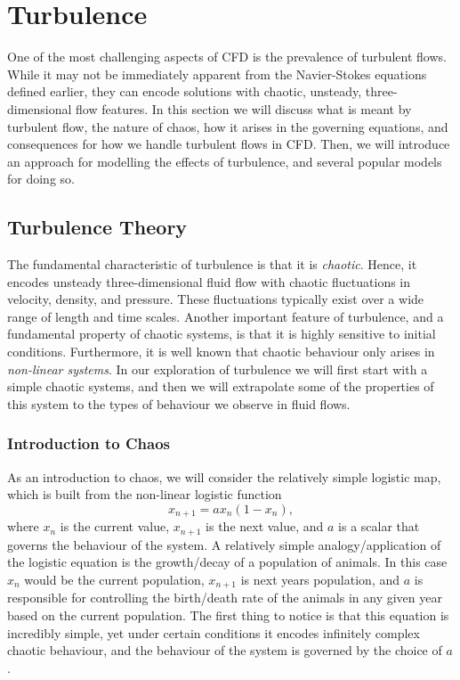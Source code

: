 \chapter{Turbulence}
One of the most challenging aspects of CFD is the prevalence of turbulent flows. While it may not be immediately apparent from the Navier-Stokes equations defined earlier, they can encode solutions with chaotic, unsteady, three-dimensional flow features. In this section we will discuss what is meant by turbulent flow, the nature of chaos, how it arises in the governing equations, and consequences for how we handle turbulent flows in CFD. Then, we will introduce an approach for modelling the effects of turbulence, and several popular models for doing so.

\section{Turbulence Theory}
The fundamental characteristic of turbulence is that it is {\it chaotic}. Hence, it encodes unsteady three-dimensional fluid flow with chaotic fluctuations in velocity, density, and pressure. These fluctuations typically exist over a wide range of length and time scales. Another important feature of turbulence, and a fundamental property of chaotic systems, is that it is highly sensitive to initial conditions. Furthermore, it is well known that chaotic behaviour only arises in {\it non-linear systems}. In our exploration of turbulence we will first start with a simple chaotic systems, and then we will extrapolate some of the properties of this system to the types of behaviour we observe in fluid flows.

\subsection{Introduction to Chaos}
As an introduction to chaos, we will consider the relatively simple logistic map, which is built from the non-linear logistic function
\begin{equation}
	x_{n+1} = ax_n(1-x_n),
\end{equation}
where $x_n$ is the current value, $x_{n+1}$ is the next value, and $a$ is a scalar that governs the behaviour of the system. A relatively simple analogy/application of the logistic equation is the growth/decay of a population of animals. In this case $x_n$ would be the current population, $x_{n+1}$ is next years population, and $a$ is responsible for controlling the birth/death rate of the animals in any given year based on the current population. The first thing to notice is that this equation is incredibly simple, yet under certain conditions it encodes infinitely complex chaotic behaviour, and the behaviour of the system is governed by the choice of $a$.

